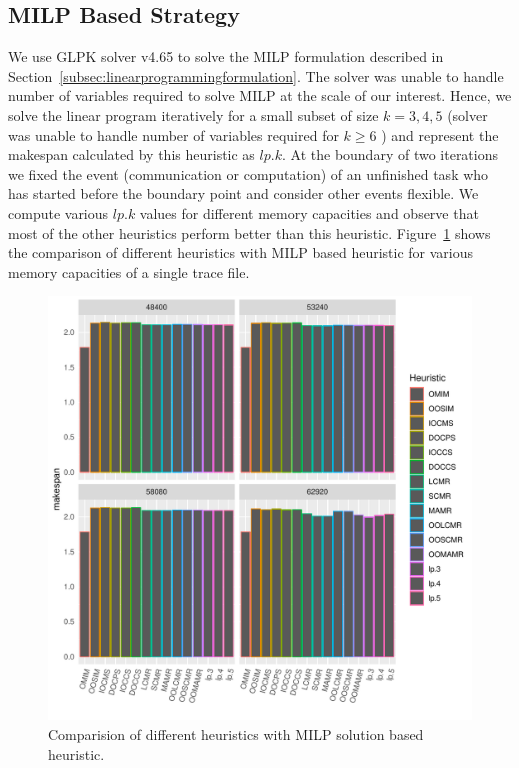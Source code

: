 \documentclass[sigconf]{acmart}
\begin{document}
\subsection{MILP Based Strategy}
We use GLPK solver v4.65 to solve the MILP formulation described in Section~\ref{subsec:linearprogrammingformulation}. The solver was unable to handle number of variables required to solve MILP at the scale of our interest. Hence, we solve the linear program iteratively for a small subset of size $k=3,4,5$ (solver was unable to handle number of variables required for $k\ge6$ ) and represent the makespan calculated by this heuristic as $lp.k$. At the boundary of two iterations we fixed the event (communication or computation) of an unfinished task who has  started before the boundary point and consider other events flexible. We compute various  $lp.k$ values for different memory capacities and observe that most of the other heuristics perform better than this heuristic. Figure~\ref{fig:iterativeLpSolution} shows the comparison of different heuristics with MILP based heuristic for various memory capacities of a single trace file.
\begin{figure}[htb]
	\includegraphics[scale=0.5]{./results/makespan_with_lp.pdf}
	\caption{Comparision of different heuristics with MILP solution based heuristic.}
	\label{fig:iterativeLpSolution}
\end{figure}
\end{document}
